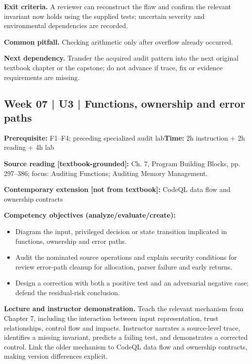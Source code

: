\documentclass[10pt,letterpaper]{article}
\begin{document}
\textbf{Exit criteria.} A reviewer can reconstruct the flaw and confirm the relevant invariant now holds using the supplied tests; uncertain severity and environmental dependencies are recorded.

\textbf{Common pitfall.} Checking arithmetic only after overflow already occurred.

\textbf{Next dependency.} Transfer the acquired audit pattern into the next original textbook chapter or the capstone; do not advance if trace, fix or evidence requirements are missing.

\subsection{Week 07 | U3 | Functions, ownership and error paths}
\textbf{Prerequisite:} F1--F4; preceding specialized audit lab\hfill\textbf{Time:} 2h instruction + 2h reading + 4h lab

\textbf{Source reading [textbook-grounded]:} Ch. 7, Program Building Blocks, pp. 297--386; focus: Auditing Functions; Auditing Memory Management.

\textbf{Contemporary extension [not from textbook]:} CodeQL data flow and ownership contracts

\textbf{Competency objectives (analyze/evaluate/create):}
\begin{itemize}[leftmargin=*,itemsep=2pt]
\item Diagram the input, privileged decision or state transition implicated in functions, ownership and error paths.
\item Audit the nominated source operations and explain security conditions for review error-path cleanup for allocation, parser failure and early returns.
\item Design a correction with both a positive test and an adversarial negative case; defend the residual-risk conclusion.
\end{itemize}
\textbf{Lecture and instructor demonstration.} Teach the relevant mechanism from Chapter 7, including the interaction between input representation, trust relationships, control flow and impacts. Instructor narrates a source-level trace, identifies a missing invariant, predicts a failing test, and demonstrates a corrected control. Link the older mechanism to CodeQL data flow and ownership contracts, making version differences explicit.
\end{document}
